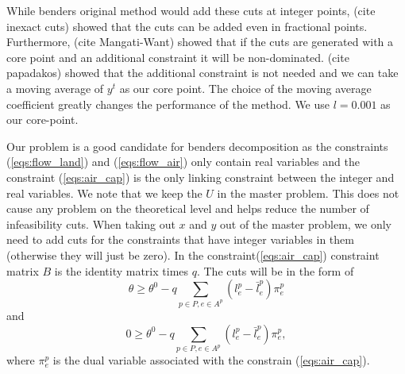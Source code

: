 \documentclass{article}
\begin{document}
	While benders original method would add these cuts at integer points, (cite inexact cuts) showed that the cuts can be added even in fractional points. Furthermore, (cite Mangati-Want) showed that if the cuts are generated with a core point and an additional constraint it will be non-dominated. (cite papadakos) showed that the additional constraint is not needed and we can take a moving average of $y^t$ as our core point. The choice of the moving average coefficient greatly changes the performance of the method. We use $l=0.001$ as our core-point.
	
	Our problem is a good candidate for benders decomposition as the constraints (\ref{eqs:flow_land}) and (\ref{eqs:flow_air}) only contain real variables and the constraint (\ref{eqs:air_cap}) is the only linking constraint between the integer and real variables. We note that we keep the $U$ in the master problem. This does not cause any problem on the theoretical level and helps reduce the number of infeasibility cuts. 
    When taking out $x$ and $y$ out of the master problem, we only need to add cuts for the constraints that have integer variables in them (otherwise they will just be zero). In the constraint(\ref{eqs:air_cap}) constraint matrix $B$ is the identity matrix times $q$. The cuts will be in the form of 
	\begin{equation}
		\theta \geq \theta^0  - q\sum_{p \in P, e \in A^p} (l^p_e - \bar{l}^p_e) \pi^p_e
	\end{equation}
	and
	\begin{equation}
		0 \geq \theta^0 - q\sum_{p \in P, e \in A^p} (l^p_e - \bar{l}^p_e)  \pi^p_e,
	\end{equation}
	where $ \pi^p_e$ is the dual variable associated with the constrain (\ref{eqs:air_cap}).
	
\end{document}
